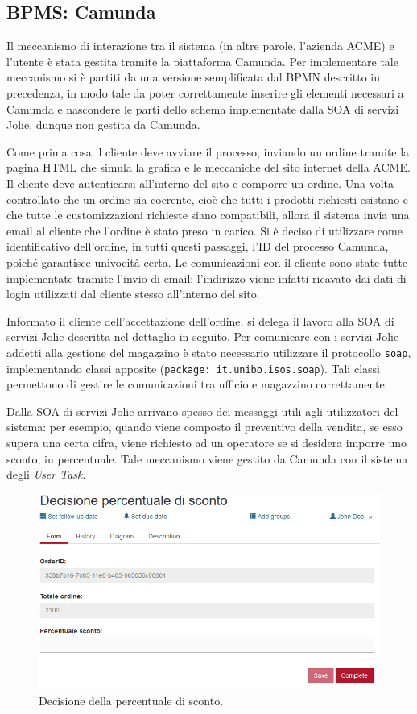 \subsection{BPMS: Camunda}
Il meccanismo di interazione tra il sistema (in altre parole, l'azienda
ACME) e l'utente \`e stata gestita tramite la piattaforma Camunda.
Per implementare tale meccanismo si \`e partiti da una versione
semplificata dal BPMN descritto in precedenza, in modo tale da poter
correttamente inserire gli elementi necessari a Camunda e nascondere le
parti dello schema implementate dalla SOA di servizi Jolie, dunque non
gestita da Camunda.

Come prima cosa il cliente deve avviare il processo, inviando un ordine
tramite la pagina HTML che simula la grafica e le meccaniche del sito
internet della ACME.
Il cliente deve autenticarsi all'interno del sito e comporre un ordine.
Una volta controllato che un ordine sia coerente, cio\`e che tutti i
prodotti richiesti esistano e che tutte le customizzazioni richieste
siano compatibili, allora il sistema invia una email al cliente che
l'ordine \`e stato preso in carico.
Si \`e deciso di utilizzare come identificativo dell'ordine, in tutti
questi passaggi, l'ID del processo Camunda, poich\'e garantisce
univocit\`a certa.
Le comunicazioni con il cliente sono state tutte implementate tramite
l'invio di email: l'indirizzo viene infatti ricavato dai dati di login
utilizzati dal cliente stesso all'interno del sito.

Informato il cliente dell'accettazione dell'ordine, si delega il lavoro
alla SOA di servizi Jolie descritta nel dettaglio in seguito.
Per comunicare con i servizi Jolie addetti alla gestione del magazzino
\`e stato necessario utilizzare il protocollo {\tt soap}, implementando
classi apposite ({\tt package: it.unibo.isos.soap}). Tali classi
permettono di gestire le comunicazioni tra ufficio e magazzino
correttamente.

Dalla SOA di servizi Jolie arrivano spesso dei messaggi utili agli
utilizzatori del sistema: per esempio, quando viene composto il
preventivo della vendita, se esso supera una certa cifra, viene
richiesto ad un operatore se si desidera imporre uno sconto, in
percentuale.
Tale meccanismo viene gestito da Camunda con il sistema degli
\textit{User Task}.
\begin{figure}
  \includegraphics[scale=0.6]{immagini/camunda_percentuale_sconto.PNG}
  \captionsetup{labelformat=empty}
  \caption{Decisione della percentuale di sconto.}
\end{figure}

